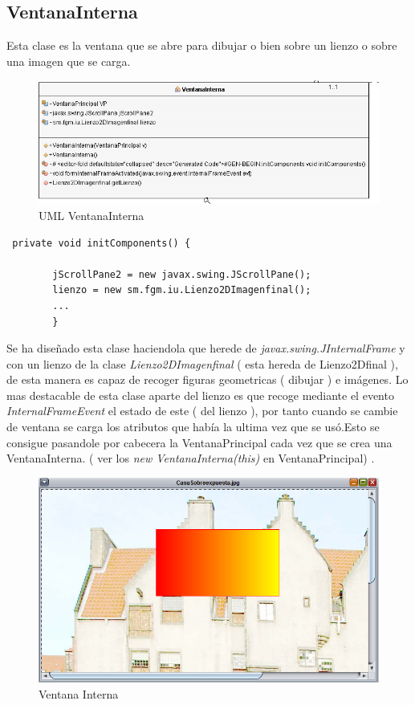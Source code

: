 \subsection{VentanaInterna}
Esta clase es la ventana que se abre para dibujar o bien sobre un lienzo o sobre una imagen que se carga.
\begin{figure}[H]
  \centering
    \includegraphics[scale=0.60]{images/ventanaInterna}
  \caption{UML VentanaInterna}
  \label{UML VentanaInterna}
\end{figure}
\begin{lstlisting}
 private void initComponents() {

        jScrollPane2 = new javax.swing.JScrollPane();
        lienzo = new sm.fgm.iu.Lienzo2DImagenfinal();
        ...
        }
\end{lstlisting}
Se ha diseñado esta clase haciendola que herede de \emph{javax.swing.JInternalFrame} y con un lienzo de la clase \emph{Lienzo2DImagenfinal} ( esta hereda de Lienzo2Dfinal ), de esta manera es capaz de recoger figuras geometricas ( dibujar ) e imágenes.
Lo mas destacable de esta clase aparte del lienzo es que recoge mediante el evento \emph{InternalFrameEvent} el estado de este ( del lienzo ), por tanto cuando se cambie de ventana se carga los atributos que había la ultima vez que se usó.Esto se consigue pasandole por cabecera la VentanaPrincipal cada vez que se crea una VentanaInterna. ( ver los \emph{new VentanaInterna(this)} en VentanaPrincipal) .
\begin{figure}[H]
  \centering
    \includegraphics[scale=0.40]{images/ventanainterna}
  \caption{Ventana Interna}
  \label{Ventana Interna}
\end{figure}

